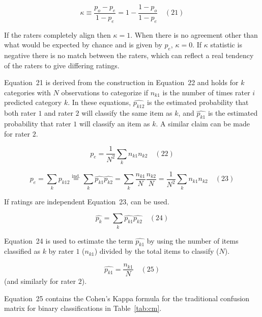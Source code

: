 \documentclass[sn-mathphys-num]{sn-jnl}%
\begin{document}
\begin{equation}
	\kappa \equiv {\frac {p_{o}-p_{e}}{1-p_{e}}}=1-{\frac {1-p_{o}}{1-p_{e}}}
	\quad\left(21\right)
\end{equation}

If the raters completely align then $\kappa = 1$. When there is no agreement other than what would be expected by chance and is given by $p_{e}$, $\kappa = 0$. If $\kappa$ statistic is negative \cite{sim2005kappa} there is no match between the raters, which can reflect a real tendency of the raters to give differing ratings.

Equation~21 is derived from the construction in Equation~22 and holds for $k$ categories with $N$ observations to categorize if $n_{k1}$ is the number of times rater $i$ predicted category $k$. In these equations, ${\widehat{p_{k12}}}$ is the estimated probability that both rater $1$ and rater $2$ will classify the same item as $k$, and ${\widehat {p_{k1}}}$ is the estimated probability that rater $1$ will classify an item as $k$. A similar claim can be made for rater $2$.

\begin{equation}
	p_{e}={\frac {1}{N^{2}}}\sum_{k}n_{k1}n_{k2}
	\quad\left(22\right)
\end{equation}

\begin{equation}
	p_{e}=\sum_{k}{\widehat {p_{k12}}}{\overset{\text{ind.}}{=}}\sum_{k}{\widehat {p_{k1}}}{\widehat {p_{k2}}}=\sum_{k}{\frac {n_{k1}}{N}}{\frac {n_{k2}}{N}}={\frac {1}{N^{2}}}\sum_{k}n_{k1}n_{k2}
	\quad\left(23\right)
\end{equation}

If ratings are independent Equation~23, can be used.

\begin{equation}
	\textstyle{\widehat{p_{k}}}=\sum_{k}{\widehat{p_{k1}}}{\widehat {p_{k2}}}
	\quad\left(24\right)
\end{equation}

Equation~24 is used to estimate the term $\widehat{p_{k1}}$ by using the number of items classified as $k$ by rater $1$ ($n_{k1}$) divided by the total items to classify ($N$).

\begin{equation}
	\widehat {p_{k1}}=\frac{n_{k1}}{N}
	\quad\left(25\right)
\end{equation}
 (and similarly for rater $2$).
 
Equation~25 contains the Cohen's Kappa formula \cite{chicco2021matthews} for the traditional confusion matrix for binary classifications in Table~\ref{tab:cm}.
\end{document}
